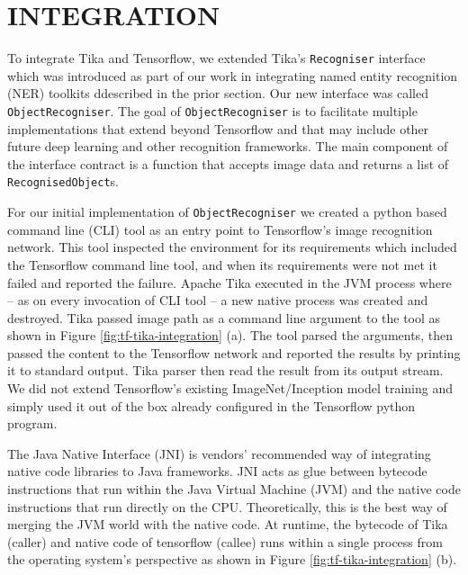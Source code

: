 
\section{INTEGRATION} \label{sec:integration}
To integrate Tika and Tensorflow, we extended Tika's \texttt{Recogniser} interface which was introduced as part of our work in integrating named entity recognition (NER) toolkits ddescribed in the prior section. Our new interface was called \texttt{ObjectRecogniser}. The goal of \texttt{ObjectRecogniser} is to facilitate multiple implementations that extend beyond Tensorflow and that may include other future deep learning and other recognition frameworks. The main component of the interface contract is a function that accepts image data and returns a list of \texttt{RecognisedObject}s.

For our initial implementation of \texttt{ObjectRecogniser} we created a python based command line (CLI) tool as an entry point to Tensorflow's image recognition network. This tool inspected the environment for its requirements which included the Tensorflow command line tool, and when its requirements were not met it failed and reported the failure. Apache Tika executed in the JVM process where -- as on every invocation of CLI tool -- a new native process was created and destroyed. Tika passed image path as a command line argument to the tool as shown in Figure \ref{fig:tf-tika-integration} (a). The tool parsed the arguments, then passed the content to the Tensorflow network and reported the results by printing it to standard output. Tika parser then read the result from its output stream. We did not extend Tensorflow's existing ImageNet/Inception model training and simply used it out of the box already configured in the Tensorflow python program.

The Java Native Interface (JNI) is vendors' recommended way of integrating native code libraries to Java frameworks\cite{gordon1998essential}. JNI acts as glue between bytecode instructions that run within the Java Virtual Machine (JVM) and the native code instructions that run directly on the CPU. Theoretically, this is the best way of merging the JVM world with the native code. At runtime, the bytecode of Tika (caller) and native code of tensorflow (callee) runs within a single process from the operating system's perspective as shown in Figure \ref{fig:tf-tika-integration} (b).

